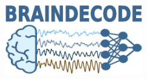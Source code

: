 \begin{titlepage}
    \begin{addmargin}[-1cm]{-3cm}
    \begin{center}
        \large

        \hfill

        \vfill

        \begingroup
            \color{CTtitle}\spacedallcaps{\myTitle} \\ \bigskip
        \endgroup

        \spacedlowsmallcaps{\myName}

        \vfill
        \includegraphics[width=6cm]{images/braindecode_logo.png} \\
          \medskip

        \medskip

        \myTime

        \vfill

    \end{center}
  \end{addmargin}
\end{titlepage}

